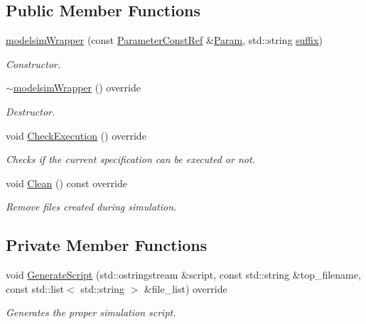 \subsection*{Public Member Functions}
\begin{DoxyCompactItemize}
\item 
\hyperlink{classmodelsimWrapper_aa5ea5e63c543de87a906a0a306967388}{modelsim\+Wrapper} (const \hyperlink{Parameter_8hpp_a37841774a6fcb479b597fdf8955eb4ea}{Parameter\+Const\+Ref} \&\hyperlink{classSimulationTool_adc409fd8f18901e2d0ea4a6ab6690138}{Param}, std\+::string \hyperlink{classmodelsimWrapper_a1e6782025a8c2dea2fc3dc42943e1755}{suffix})
\begin{DoxyCompactList}\small\item\em Constructor. \end{DoxyCompactList}\item 
\hyperlink{classmodelsimWrapper_a37da7aca21cf9be213b913ed870ea8ae}{$\sim$modelsim\+Wrapper} () override
\begin{DoxyCompactList}\small\item\em Destructor. \end{DoxyCompactList}\item 
void \hyperlink{classmodelsimWrapper_a79d1a35dffbeaa4787958acb7d2632ed}{Check\+Execution} () override
\begin{DoxyCompactList}\small\item\em Checks if the current specification can be executed or not. \end{DoxyCompactList}\item 
void \hyperlink{classmodelsimWrapper_a835022e305a7b22a8b62486558cf7542}{Clean} () const override
\begin{DoxyCompactList}\small\item\em Remove files created during simulation. \end{DoxyCompactList}\end{DoxyCompactItemize}
\subsection*{Private Member Functions}
\begin{DoxyCompactItemize}
\item 
void \hyperlink{classmodelsimWrapper_a5eaa08f8c0b15b12a72046e04f290b86}{Generate\+Script} (std\+::ostringstream \&script, const std\+::string \&top\+\_\+filename, const std\+::list$<$ std\+::string $>$ \&file\+\_\+list) override
\begin{DoxyCompactList}\small\item\em Generates the proper simulation script. \end{DoxyCompactList}\end{DoxyCompactItemize}
